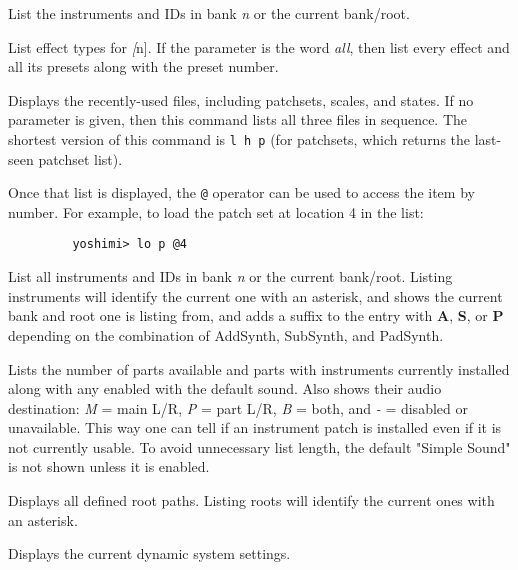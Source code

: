       List the instruments and IDs in bank \textsl{n} or the
      current bank/root.

      List effect types for \textsl[n].
      If the parameter is the word \textsl{all},
      then list every effect and all its
      presets along with the preset number.

      Displays the recently-used files, including patchsets, scales, and
      states.  If no parameter is given, then this command lists all three
      files in sequence.  The shortest version of this command is
      \texttt{l h p} (for patchsets, which returns the last-seen patchset list).

      Once that list is displayed,
      the \texttt{@} operator can be used to access
      the item by number.  For example, to load the patch set at location 4 in
      the list:

      \begin{verbatim}
         yoshimi> lo p @4
      \end{verbatim}

      List all instruments and IDs in bank \textsl{n}
      or the current bank/root.
      Listing instruments will identify the current one with an asterisk, and
      shows the current bank and root one is listing from, and adds a suffix to
      the entry with \textbf{A}, \textbf{S}, or \textbf{P}
      depending on the combination of AddSynth, SubSynth, and PadSynth.

      Lists the number of parts available and parts with instruments
      currently installed along with any enabled with the default sound.
      Also shows their audio destination:
      \textsl{M} = main L/R, \textsl{P} = part L/R, \textsl{B} = both, and
      \textsl{-} = disabled or unavailable.
      This way one can tell if an instrument patch is installed even if it is
      not currently usable.
      To avoid unnecessary list length, the default "Simple Sound" is not shown
      unless it is enabled.

      Displays all defined root paths.
      Listing roots will identify the current ones with an asterisk.

      Displays the current dynamic system settings.

